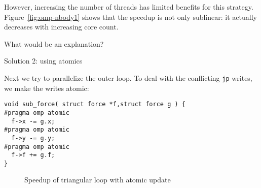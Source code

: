 However, increasing the number of threads has limited benefits for this strategy.
Figure~\ref{fig:omp-nbody1} shows that
the speedup is not only sublinear:
it actually decreases with increasing core count.

\begin{comment}
\begin{verbatim}
================ #threads = 1 ================
               Sequential: 2.029093e+01; 
       Full loop Parallel: 3.118345e+00; speedup= 6.51
================ #threads = 18 ================
       Full loop Parallel: 1.940827e+00; speedup=10.46
================ #threads = 37 ================
       Full loop Parallel: 4.390490e+00; speedup= 4.63
================ #threads = 56 ================
       Full loop Parallel: 8.484191e+00; speedup= 2.40
\end{verbatim}
\end{comment}

\begin{exercise}
  What would be an explanation?
\end{exercise}

 {Solution 2: using atomics}

Next we try to parallelize the outer loop.
To deal with the conflicting \lstinline{jp} writes,
we make the writes atomic:
\begin{lstlisting}
void sub_force( struct force *f,struct force g ) {
#pragma omp atomic
  f->x -= g.x;
#pragma omp atomic
  f->y -= g.y;
#pragma omp atomic
  f->f += g.f;
}
\end{lstlisting}

\begin{figure}[t]
  \label{fig:omp-nbody2}
  \caption{Speedup of triangular loop with atomic update}
\end{figure}


